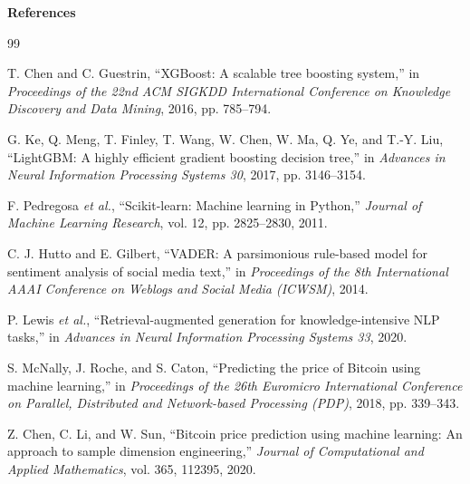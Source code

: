 \clearpage
\thispagestyle{empty}
\vspace*{\fill}
\begin{center}{\LARGE\bfseries References}\end{center}
\vspace*{\fill}
\clearpage
{}
\makeatletter
\let\origchapter\chapter
\renewcommand{\chapter}{\@ifstar{\@gobble}{\origchapter}}
\makeatother
\begin{thebibliography}{99}

T. Chen and C. Guestrin, ``XGBoost: A scalable tree boosting system,'' in \textit{Proceedings of the 22nd ACM SIGKDD International Conference on Knowledge Discovery and Data Mining}, 2016, pp. 785--794.

G. Ke, Q. Meng, T. Finley, T. Wang, W. Chen, W. Ma, Q. Ye, and T.-Y. Liu, ``LightGBM: A highly efficient gradient boosting decision tree,'' in \textit{Advances in Neural Information Processing Systems 30}, 2017, pp. 3146--3154.

F. Pedregosa \textit{et al.}, ``Scikit-learn: Machine learning in Python,'' \textit{Journal of Machine Learning Research}, vol. 12, pp. 2825--2830, 2011.

C. J. Hutto and E. Gilbert, ``VADER: A parsimonious rule-based model for sentiment analysis of social media text,'' in \textit{Proceedings of the 8th International AAAI Conference on Weblogs and Social Media (ICWSM)}, 2014.

P. Lewis \textit{et al.}, ``Retrieval-augmented generation for knowledge-intensive NLP tasks,'' in \textit{Advances in Neural Information Processing Systems 33}, 2020.

S. McNally, J. Roche, and S. Caton, ``Predicting the price of Bitcoin using machine learning,'' in \textit{Proceedings of the 26th Euromicro International Conference on Parallel, Distributed and Network-based Processing (PDP)}, 2018, pp. 339--343.

Z. Chen, C. Li, and W. Sun, ``Bitcoin price prediction using machine learning: An approach to sample dimension engineering,'' \textit{Journal of Computational and Applied Mathematics}, vol. 365, 112395, 2020.


\end{thebibliography}
